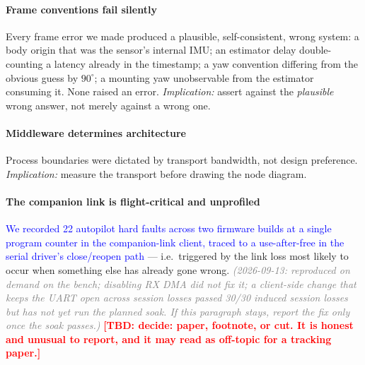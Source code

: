 \documentclass[conference]{IEEEtran}
\newcommand{\tbd}[1]{\textcolor{red}{\textbf{[TBD: #1]}}}
\newcommand{\bench}[1]{\textcolor{blue}{#1}}
\newcommand{\note}[1]{\textcolor{gray}{\textit{(#1)}}}
\begin{document}
\paragraph{Frame conventions fail silently} Every frame error we made produced a
plausible, self-consistent, wrong system: a body origin that was the sensor's
internal IMU; an estimator delay double-counting a latency already in the
timestamp; a yaw convention differing from the obvious guess by $90^\circ$; a
mounting yaw unobservable from the estimator consuming it. None raised an error.
\emph{Implication:} assert against the \emph{plausible} wrong answer, not merely
against a wrong one.

\paragraph{Middleware determines architecture} Process boundaries were dictated
by transport bandwidth, not design preference. \emph{Implication:} measure the
transport before drawing the node diagram.

\paragraph{The companion link is flight-critical and unprofiled}
\bench{We recorded 22 autopilot hard faults across two firmware builds at a single
program counter in the companion-link client, traced to a use-after-free in the
serial driver's close/reopen path} --- i.e.\ triggered by the link loss most
likely to occur when something else has already gone wrong.
\note{2026-09-13: reproduced on demand on the bench; disabling RX DMA did not fix it; a
client-side change that keeps the UART open across session losses passed 30/30 induced
session losses but has not yet run the planned soak. If this paragraph stays, report the fix
only once the soak passes.}
\tbd{decide: paper, footnote, or cut. It is honest and unusual to report, and it
may read as off-topic for a tracking paper.}

\end{document}
